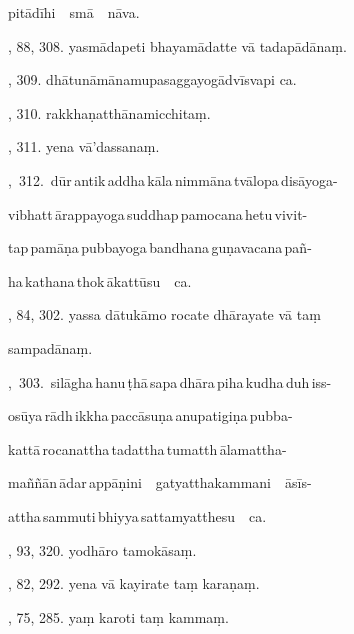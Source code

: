 \hspace{15mm} pitādīhi\ \ smā\ \ nāva.\hfill \pageref{sut:270}\par {}, 88, 308. yasmādapeti bhayamādatte vā tadapādānaṃ.\par \noindent
\hfill \pageref{sut:271}\par {}, 309. dhātunāmānamupasaggayogādvīsvapi ca.\hfill \pageref{sut:272}\par {}, 310. rakkhaṇatthānamicchitaṃ.\hfill \pageref{sut:273}\par {}, 311. yena vā’dassanaṃ.\hfill \pageref{sut:274}\par {},~312.~dūr\,antik\,addha\,kāla\,nimmāna\,tvālopa\,disāyoga-\par \noindent
\hspace{15mm} vibhatt\,ārappayoga\,suddhap\,pamocana\,hetu\,vivit-\par \noindent
\hspace{15mm} tap\,pamāṇa\,pubbayoga\,bandhana\,guṇavacana\,pañ-\par \noindent
\hspace{15mm} ha\,kathana\,thok\,ākattūsu\ \ ca.\hfill \pageref{sut:275}\par {}, 84, 302. yassa dātukāmo rocate dhārayate vā taṃ\par \noindent
\hspace{15mm} sampadānaṃ.\hfill \pageref{sut:276}\par {},~303.~silāgha\,hanu\,ṭhā\,sapa\,dhāra\,piha\,kudha\,duh\,iss-\par \noindent
\hspace{15mm} osūya\,rādh\,ikkha\,paccāsuṇa\,anupatigiṇa\,pubba-\par \noindent
\hspace{15mm} kattā\,rocanattha\,tadattha\,tumatth\,ālamattha-\par \noindent
\hspace{15mm} maññān\,ādar\,appāṇini\ \ gatyatthakammani\ \ āsīs-\par \noindent
\hspace{15mm} attha\,sammuti\,bhiyya\,sattamyatthesu\ \ ca.\hfill \pageref{sut:277}\par {}, 93, 320. yodhāro tamokāsaṃ.\hfill \pageref{sut:278}\par {}, 82, 292. yena vā kayirate taṃ karaṇaṃ.\hfill \pageref{sut:279}\par {}, 75, 285. yaṃ karoti taṃ kammaṃ.\hfill \pageref{sut:280}\par \noindent
